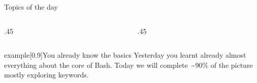 
\begin{frame}
    \titlepage
\end{frame}
\begin{frame}[label=toc,plain,noframenumbering]{Topics of the day}
    \bigskip
    \begin{columns}[t]
        \begin{column}{.45\textwidth}
            \hspace*{4mm}
            \begin{minipage}[t][0.45\textheight]{\textwidth}
                \tableofcontents[sections={1-5}]
            \end{minipage}
        \end{column}
        \begin{column}{.45\textwidth}
            \begin{minipage}[t][0.45\textheight]{\textwidth}
                \tableofcontents[sections={6-}]
            \end{minipage}
        \end{column}
    \end{columns}
    \vspace{6mm}
    \begin{varblock}{example}[0.9\textwidth]{You already know the basics}
        Yesterday you learnt already almost everything about the core of Bash.
        Today we will complete \,\textasciitilde90\% of the picture mostly exploring keywords.
    \end{varblock}
\end{frame}
